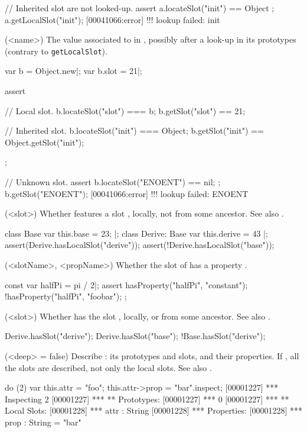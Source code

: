 \begin{urbiscriptapi}
\begin{urbiscript}
// Inherited slot are not looked-up.
assert { a.locateSlot("init") == Object };
a.getLocalSlot("init");
[00041066:error] !!! lookup failed: init
\end{urbiscript}

\item[getSlot](<name>)%
  The value associated to  in \this, possibly
  after a look-up in its prototypes (contrary to
  \lstinline|getLocalSlot|).
\begin{urbiscript}
var b = Object.new|;
var b.slot = 21|;

assert
{
  // Local slot.
  b.locateSlot("slot") === b;
  b.getSlot("slot") == 21;

  // Inherited slot.
  b.locateSlot("init") === Object;
  b.getSlot("init") == Object.getSlot("init");
};

// Unknown slot.
assert { b.locateSlot("ENOENT") == nil; };
b.getSlot("ENOENT");
[00041066:error] !!! lookup failed: ENOENT
\end{urbiscript}

\item[hasLocalSlot](<slot>)%
  Whether \this features a slot , locally, not
  from some ancestor.  See also .
\begin{urbiscript}
class Base         { var this.base = 23; } |;
class Derive: Base { var this.derive = 43 } |;
assert(Derive.hasLocalSlot("derive"));
assert(!Derive.hasLocalSlot("base"));
\end{urbiscript}

\item[hasProperty](<slotName>, <propName>)%
  Whether the slot  of \this has a property
  .
\begin{urbiscript}
const var halfPi = pi / 2|;
assert
{
  hasProperty("halfPi", "constant");
  !hasProperty("halfPi", "foobar");
};
\end{urbiscript}

\item[hasSlot](<slot>)%
  Whether \this has the slot , locally, or from
  some ancestor.  See also .

\begin{urbiassert}
Derive.hasSlot("derive");
Derive.hasSlot("base");
!Base.hasSlot("derive");
\end{urbiassert}

\item['$id']%

\item[inspect](<deep> = false)%
  Describe \this: its prototypes and slots, and their
  properties.  If , all the slots are described, not only
  the local slots. See also .
\begin{urbiscript}
do (2) { var this.attr = "foo"; this.attr->prop = "bar"}.inspect;
[00001227] *** Inspecting 2
[00001227] *** ** Prototypes:
[00001227] ***   0
[00001227] *** ** Local Slots:
[00001228] ***   attr : String
[00001228] ***     Properties:
[00001228] ***      prop : String = "bar"
\end{urbiscript}


\end{urbiscriptapi}
